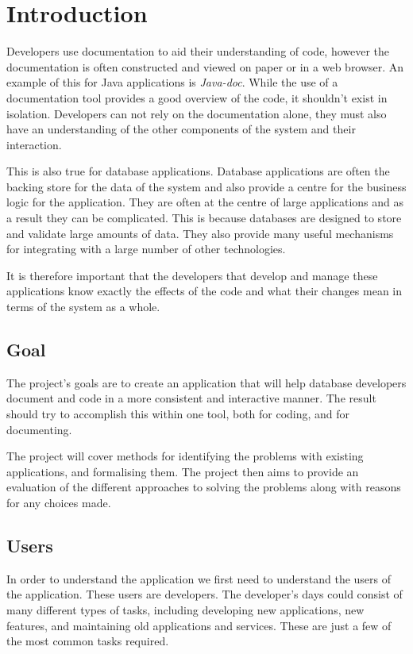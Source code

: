 \chapter{Introduction}\label{introduction}

Developers use documentation to aid their understanding of code, however the
documentation is often constructed and viewed on paper or in a web browser. An
example of this for Java applications is \textit{Java-doc}\cite{javadoc}. While the use
of a documentation tool provides a good overview of the code, it shouldn't
exist in isolation.  Developers can not rely on the documentation alone, they must
also have an understanding of the other components of the system and their
interaction.

This is also true for database applications. Database applications are often the
backing store for the data of the system and also provide a centre for the
business logic for the application. They are often at the centre of large
applications and as a result they can be complicated. This is because databases
are designed to store and validate large amounts of data. They also provide many
useful mechanisms for integrating with a large number of other technologies.

It is therefore important that the developers that develop and manage
these applications know exactly the effects of the code and what their
changes mean in terms of the system as a whole.

\section{Goal}\label{project-goal}

The project's goals are to create an application that will help database
developers document and code in a more consistent and interactive
manner. The result should try to accomplish this within one tool, both for coding, and for documenting.

The project will cover methods for identifying the problems with existing
applications, and formalising them. The project then aims to provide an
evaluation of the different approaches to solving the problems along with
reasons for any choices made.

\section{Users}\label{users}

In order to understand the application we first need to understand the
users of the application. These users are developers. The developer's
days could consist of many different types of tasks, including developing new
applications, new features, and maintaining old applications and
services. These are just a few of the most common tasks required.

